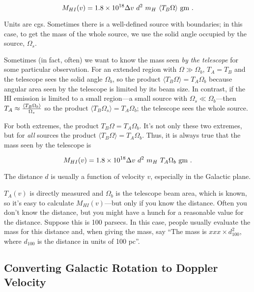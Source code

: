 \documentclass[psfig,preprint]{aastex}
\begin{document}
\begin{equation}  \label{telemass}
M_{HI}(v) = 1.8 \times 10^{18} \Delta v \ d^2 \  m_H \ \langle T_B  \Omega\rangle \ {\rm
gm} \ . 
\end{equation}

\noindent Units are cgs. Sometimes there is a well-defined source with
boundaries; in this case, to get the mass of the whole source, we use
the solid angle occupied by the source, $\Omega_s$.

	Sometimes (in fact, often) we want to know the mass seen {\it by
the telescope} for some particular observation.  For an extended region
with $\Omega \gg \Omega_b$, $T_A = T_B$ and the telescope sees the solid
angle $\Omega_b$, so the product $\langle T_B \Omega\rangle = T_A
\Omega_b$ because angular area seen by the telescope is limited by its
beam size.  In contrast, if the HI emission is limited to a small
region---a small source with $\Omega_s \ll \Omega_b$---then $T_A \approx
{\langle T_B \Omega_b\rangle \over \Omega_s}$ so the product $\langle
T_B \Omega_s\rangle = T_A \Omega_b$; the telescope sees the whole
source.  

For both extremes, the product $T_B \Omega = T_A \Omega_b$. 
It's not only these two extremes, but for {\it all} sources the
product $\langle T_B \Omega \rangle= T_A \Omega_b$.  Thus, it is always true that the
mass seen by the telescope is

\begin{equation}  \label{telemass1}
M_{HI}(v) = 1.8 \times 10^{18} \Delta v \ d^2 \ m_H \ T_A  \Omega_b  \ {\rm
gm} \ . 
\end{equation}

\noindent The distance $d$ is usually a function of velocity $v$,
especially in the Galactic plane. 

	$T_A(v)$ is directly measured and $\Omega_b$ is the telescope
beam area, which is known, so it's easy to calculate $M_{HI}(v)$---but
only if you know the distance. Often you don't know the distance, but
you might have a hunch for a reasonable value for the distance. Suppose
this is 100 parsecs. In this case, people usually evaluate the mass for
this distance and, when giving the mass, say ``The mass is $xxx \times
d_{100}^2$, where $d_{100}$ is the distance in units of 100 pc''.

\subsection{Converting Galactic Rotation to Doppler Velocity}
\end{document}

